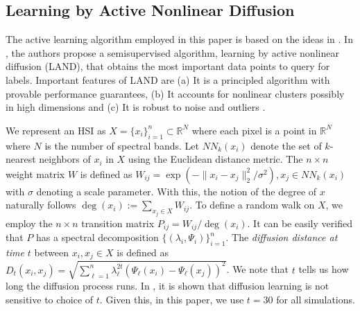 \documentclass{article}
\def\R{\mathbb{R}}
\def\R{{\mathbb R}}
\begin{document}
\subsection{Learning by Active Nonlinear Diffusion}



The active learning algorithm employed in this paper is based on the ideas in \cite{Murphy2019_Unsupervised, Maggioni2019_LUND, Murphy2020_Spectral}.  In \cite{Maggioni2019_LAND}, the authors propose a semisupervised algorithm, learning by active nonlinear diffusion (LAND), that obtains the most important data points to query  for labels.  Important features of LAND are (a) It is a principled algorithm with provable performance guarantees, (b) It accounts for nonlinear clusters possibly in high dimensions and (c) It is robust to noise and outliers \cite{Maggioni2019_LAND}.


We represent an HSI as $X=\{x_{i}\}_{i=1}^{n}\subset\mathbb{R}^{N}$ where each pixel is a point in $\R^{N}$ where $N$ is the number of spectral bands. Let $NN_{k}(x_{i})$ denote the set of $k$-nearest neighbors of $x_{i}$ in $X$ using the Euclidean distance metric.
The $n\times n$ weight matrix $W$ is defined as $W_{ij}=\exp(-\|x_{i}-x_{j}\|_{2}^{2}/\sigma^{2}), x_{j}\in NN_{k}(x_{i})$ with $\sigma$ denoting a scale parameter. With this, the notion of the degree of $x$ naturally follows $\deg(x_{i}):=\sum_{x_{j}\in X}W_{ij}$. To define a random walk on $X$, we employ the $n\times n$ transition matrix $P_{ij}={W_{ij}}\big/{\deg(x_{i})}.$ It can be easily verified that $P$ has a spectral decomposition $\{(\lambda_{i},\Psi_{i})\}_{i=1}^{n}$. The \emph{diffusion distance at time $t$} between $x_{i},x_{j}\in X$ is defined as $D_{t}(x_{i},x_{j})=\sqrt{\sum\nolimits_{\ell=1}^{n}\lambda_{\ell}^{2t}(\Psi_{\ell}(x_{i})-\Psi_{\ell}(x_{j}))^{2}}$.  We note that $t$ tells us how long the diffusion process runs. In  \cite{Murphy2019_Unsupervised}, it is shown that diffusion learning is not sensitive to choice of $t$. Given this, in this paper,  we use $t=30$ for all simulations.
\end{document}
